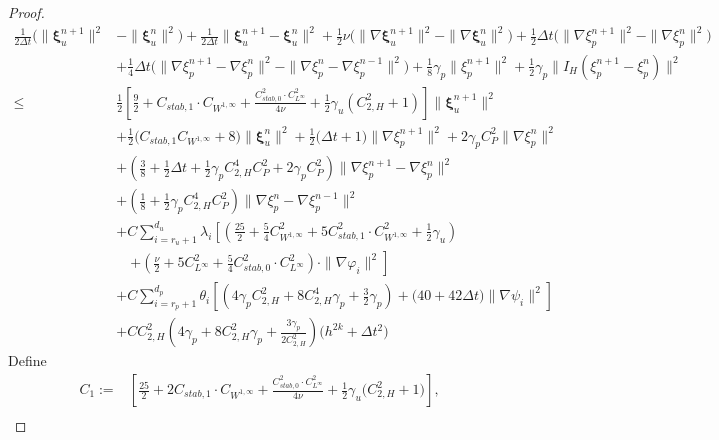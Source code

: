 \documentclass[10pt,twoside,openany,UTF8,CJK]{article}
\begin{document}
\begin{proof}
    $$
    \begin{aligned}
    	\frac{1}{2\Delta t}\bigg(\|\boldsymbol{\xi}^{n+1}_u\|^2 &- \|\boldsymbol{\xi}^n_u\|^2\bigg) + \frac{1}{2\Delta t}\|\boldsymbol{\xi}^{n+1}_u - \boldsymbol{\xi}^{n}_u\|^2 + \frac12\nu\bigg(\|\nabla\boldsymbol{\xi}^{n+1}_u\|^2 - \|\nabla\boldsymbol{\xi}^n_u\|^2\bigg) + \frac12\Delta t\bigg(\|\nabla \xi^{n+1}_p\|^2 - \|\nabla \xi^{n}_p\|^2\bigg) \\
    	& + \frac14\Delta t\bigg(\|\nabla \xi^{n+1}_p - \nabla\xi^{n}_p\|^2 - \|\nabla \xi^{n}_p - \nabla\xi^{n-1}_p\|^2\bigg) + \frac18\gamma_p\|\xi^{n+1}_p\|^2 + \frac12\gamma_p\|I_H(\xi^{n+1}_p - \xi^{n}_p)\|^2 \\
    	\leq& \frac12\left[\frac92 + C_{stab,1}\cdot C_{W^{1,\infty}} + \frac{C^2_{stab,0}\cdot C^2_{L^{\infty}}}{4\nu} + \frac12\gamma_u(C^2_{2,H} + 1)\right]\|\boldsymbol{\xi}^{n+1}_u\|^2 \\
    	&+ \frac12\bigg(C_{stab,1}C_{W^{1,\infty}} + 8\bigg)\|\boldsymbol{\xi}^n_u\|^2 + \frac12\bigg(\Delta t + 1\bigg)\|\nabla \xi^{n+1}_p\|^2 + 2\gamma_p C^2_{P}\|\nabla \xi^{n}_p\|^2\\
    	& + \left(\frac38 + \frac12\Delta t + \frac12\gamma_p C^4_{2,H}C^2_{P} + 2\gamma_p C^2_{P}\right)\|\nabla \xi^{n+1}_p - \nabla\xi^{n}_p\|^2\\
    	& + \left(\frac18 + \frac12\gamma_p C^4_{2,H}C^2_{P}\right)\|\nabla\xi^{n}_p - \nabla\xi^{n-1}_p\|^2 \\
    	&+ C\sum_{i=r_u+1}^{d_u}\lambda_i\left[\left(\frac{25}{2} + \frac{5}{4}C^2_{W^{1,\infty}} + 5C^2_{stab,1}\cdot C^2_{W^{1,\infty}} + \frac12\gamma_u\right)\right. \\
    	&\quad\left.+ \left(\frac{\nu}{2} + 5C^2_{L^{\infty}} + \frac54C^2_{stab,0}\cdot C^2_{L^{\infty}}\right)\cdot\|\nabla\varphi_i\|^2\right] \\
    	&+ C\sum_{i=r_p+1}^{d_p}\theta_i\left[\left(4\gamma_p C^2_{2,H} + 8C^4_{2,H}\gamma_p + \frac32\gamma_p \right) + \bigg(40 + 42\Delta t\bigg)\|\nabla\psi_i\|^2\right] \\
    	&+CC^2_{2,H}\left(4\gamma_p + 8C^2_{2,H}\gamma_p + \frac{3\gamma_p}{2C^2_{2,H}}\right)\bigg(h^{2k} + \Delta t^2\bigg)
    \end{aligned}
    $$
	Define
	\begin{equation}\label{6ConsDefi}
	\begin{aligned}	
		C_1 :=& \left[\frac{25}2 + 2C_{stab,1}\cdot C_{W^{1,\infty}} + \frac{C^2_{stab,0}\cdot C^2_{L^{\infty}}}{4\nu} + \frac12\gamma_u\bigg(C^2_{2,H} + 1\bigg)\right], \\

\end{aligned}
\end{equation}
\end{proof}
\end{document}
